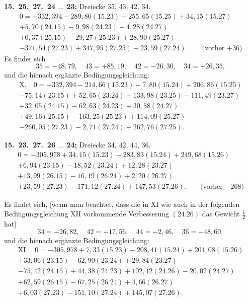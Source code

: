 \documentclass[12pt,a4paper]{article}
\theoremstyle{plain}
\theoremstyle{definition}
\theoremstyle{remark}
\begin{document}
\medskip\noindent
\textbf{15.\ 25.\ 27.\ 24 $\ldots$ 23;} Dreiecke 35, 43, 42, 34.
\begin{multline*}
0 = +332{,}394 - 289{,}80(15.23) + 255{,}65(15.25) + 34{,}15(15.27)\\
+ 5{,}70(24.15) - 9{,}98(24.23) + 4{,}28(24.27)\\
+ 0{,}37(25.15) - 29{,}27(25.23) + 28{,}90(25.27)\\
- 371{,}54(27.23) + 347{,}95(27.25) + 23{,}59(27.24).\qquad\text{(vorher $+36$)}
\end{multline*}
Es findet sich
\[35 = -48{,}79, \quad 43 = +85{,}19, \quad 42 = -26{,}30, \quad 34 = +26{,}35,\]
und die hienach erg\"anzte Bedingungsgleichung:
\begin{multline*}
\text{X.}\quad 0 = +332{,}394 - 214{,}66(15.23) + 7{,}80(15.24) + 206{,}86(15.25)\\
- 75{,}14(23.15) + 52{,}65(23.24) + 133{,}98(23.25) - 111{,}49(23.27)\\
+ 32{,}05(24.15) - 62{,}63(24.23) + 30{,}58(24.27)\\
+ 49{,}16(25.15) - 163{,}25(25.23) + 114{,}09(25.27)\\
- 260{,}05(27.23) - 2{,}71(27.24) + 262{,}76(27.25).
\end{multline*}

\medskip\noindent
\textbf{15.\ 23.\ 27.\ 26 $\ldots$ 24;} Dreiecke 34, 42, 44, 36.
\begin{multline*}
0 = -305{,}978 + 34{,}15(15.23) - 283{,}83(15.24) + 249{,}68(15.26)\\
+ 6{,}94(23.15) - 18{,}52(23.24) + 12{,}28(23.27)\\
+ 13{,}99(26.15) - 16{,}19(26.24) + 2{,}20(26.27)\\
+ 23{,}59(27.23) - 171{,}12(27.24) + 147{,}53(27.26).\qquad\text{(vorher $-268$)}
\end{multline*}

Es findet sich, [wenn man beachtet, dass die in XI wie auch in der folgenden Bedingungsgleichung XII vorkommende Verbesserung $(24.26)$ das Gewicht $\tfrac{1}{2}$ hat]
\[34 = -26{,}82, \quad 42 = +17{,}56, \quad 44 = -2{,}46, \quad 36 = +48{,}60,\]
und die hienach erg\"anzte Bedingungsgleichung:
\begin{multline*}
\text{XI.}\quad 0 = -305{,}978 + 7{,}33(15.23) - 208{,}41(15.24) + 201{,}08(15.26)\\
+ 33{,}06(23.15) - 62{,}90(23.24) + 29{,}84(23.27)\\
- 75{,}42(24.15) + 44{,}38(24.23) + 102{,}12(24.26) - 20{,}02(24.27)\\
+ 62{,}59(26.15) - 67{,}25(26.24) + 4{,}66(26.27)\\
+ 6{,}03(27.23) - 151{,}10(27.24) + 145{,}07(27.26).
\end{multline*}
\end{document}
